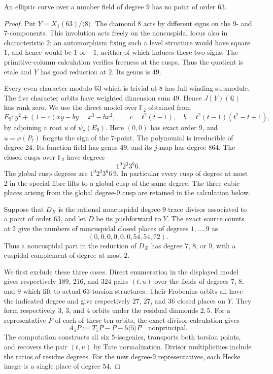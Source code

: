 
\begin{proposition}\label{prop:nonic-no63}
An elliptic curve over a number field of degree $9$ has no point of
order $63$.
\end{proposition}
\begin{proof}
Put $Y=X_1(63)/\langle8\rangle$. The diamond $8$ acts by different
signs on the $9$- and $7$-components. This involution acts freely on
the noncuspidal locus also in characteristic $2$: an automorphism
fixing such a level structure would have square $1$, and hence
would be $1$ or $-1$, neither of which induces these two signs.
The primitive-column calculation verifies freeness at the cusps.
Thus the quotient is etale and $Y$ has good reduction at $2$.
Its genus is $49$.

Every even character modulo $63$ which is trivial at $8$ has full
winding submodule. The five character orbits have weighted dimension
sum $49$. Hence $J(Y)(\mathbb Q)$ has rank zero.
We use the direct model over $\mathbb F_2$ obtained from
\[
 E_9:y^2+(1-c)xy-by=x^3-bx^2,\qquad
 c=t^2(t-1),\quad b=t^2(t-1)(t^2-t+1),
\]
by adjoining a root $u$ of $\psi_7(E_9)$.
Here $(0,0)$ has exact order $9$, and $u=x(P_7)$ forgets the sign
of the $7$-point. The polynomial is irreducible of degree $24$.
Its function field has genus $49$, and its $j$-map has degree $864$.
The closed cusps over $\mathbb F_2$ have degrees
\[
 1^9 2^3 3^9 6.
\]
The global cusp degrees are $1^9 2^3 3^6 6\,9$.
In particular every cusp of degree at most $2$ in the special
fibre lifts to a global cusp of the same degree.
The three cubic places arising from the global degree-$9$ cusp
are retained in the calculation below.

Suppose that $D_X$ is the rational noncuspidal degree-$9$ trace
divisor associated to a point of order $63$, and let $D$ be its
pushforward to $Y$. The exact source counts at $2$ give the numbers
of noncuspidal closed places of degrees $1,\ldots,9$ as
\[
 (0,0,0,0,0,0,54,54,72).
\]
Thus a noncuspidal part in the reduction of $D_X$ has degree
$7$, $8$, or $9$, with a cuspidal complement of degree at most $2$.

We first exclude these three cases.
Direct enumeration in the displayed model gives respectively
$189$, $216$, and $324$ pairs $(t,u)$ over the fields of degrees
$7$, $8$, and $9$ which lift to actual $63$-torsion structures.
Their Frobenius orbits all have the indicated degree and give
respectively $27$, $27$, and $36$ closed places on $Y$.
They form respectively $3$, $3$, and $4$ orbits under the residual
diamonds $2,5$.
For a representative $P$ of each of these ten orbits, the exact
divisor calculation gives
\[
 A_5 P:=T_5P-P-5\langle5\rangle P
 \quad\text{nonprincipal}.
\]
The computation constructs all six $5$-isogenies, transports both
torsion points, and recovers the pair $(t,u)$ by Tate normalization.
Divisor multiplicities include the ratios of residue degrees.
For the new degree-$9$ representatives, each Hecke image is a
single place of degree $54$.


\end{proof}
